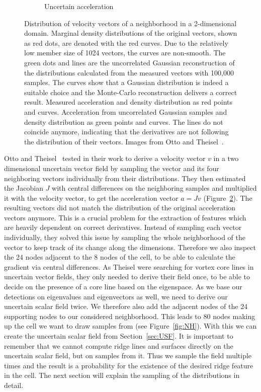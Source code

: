 \begin{figure}[t]
\begin{subfigure}{0.49\textwidth}
        \caption{Uncertain acceleration}
        \label{fig:uncacc}
    \end{subfigure}
    \caption{ Distribution of velocity vectors of a
    neighborhood in a 2-dimensional domain. Marginal density
    distributions of the original vectors, shown as red dots, are
    denoted with the red curves. Due to the relatively low member size
    of 1024 vectors, the curves are non-smooth. The green dots and lines
    are the uncorrelated Gaussian reconstruction of the distributions
    calculated from the measured vectors with 100,000 samples. The
    curves show that a Gaussian distribution is indeed a suitable
    choice and the Monte-Carlo reconstruction delivers a correct result.
     Measured acceleration and density distribution
    as red points and curves. Acceleration from uncorrelated Gaussian
    samples and density distribution as green points and curves. The lines
    do not coincide anymore, indicating that the derivatives are not
    following the distribution of their vectors. Images from Otto and
    Theisel~\cite{Vortex}.}
    \label{fig:Theisel}
\end{figure}
\indent Otto and Theisel~\cite{Vortex} tested in their work to derive a
velocity vector $v$ in a two dimensional uncertain vector field by
sampling the vector and its four neighboring vectors individually from
their distributions. They then estimated the Jacobian $J$ with central
differences on the neighboring samples and multiplied it with the
velocity vector, to get the acceleration vector $a = J v$
(Figure~\ref{fig:Theisel}). The resulting vectors did not match the
distribution of the original acceleration vectors anymore. This is a
crucial problem for the extraction of features which are heavily
dependent on correct derivatives. Instead of sampling each vector
individually, they solved this issue by sampling the whole neighborhood
of the vector to keep track of its change along the dimensions.
Therefore we also inspect the 24 nodes adjacent to the 8 nodes of the
cell, to be able to calculate the gradient via central differences. As
Theisel \etal{} were searching for vortex core lines in uncertain vector
fields, they only needed to derive their field once, to be able to
decide on the presence of a core line based on the eigenspace. As we
base our detections on eigenvalues and eigenvectors as well, we need to
derive our uncertain scalar field twice. We therefore also add the
adjacent nodes of the 24 supporting nodes to our considered
neighborhood. This leads to 80 nodes making up the cell we want to draw
samples from (see Figure~\ref{fig:NH}). With this we can create the
uncertain scalar field from Section~\ref{sec:USF}. It is important to
remember that we cannot compute ridge lines and surfaces directly on the
uncertain scalar field, but on samples from it. Thus we sample the field
multiple times and the result is a probability for the existence of the
desired ridge feature in the cell. The next section will explain the
sampling of the distributions in detail.

